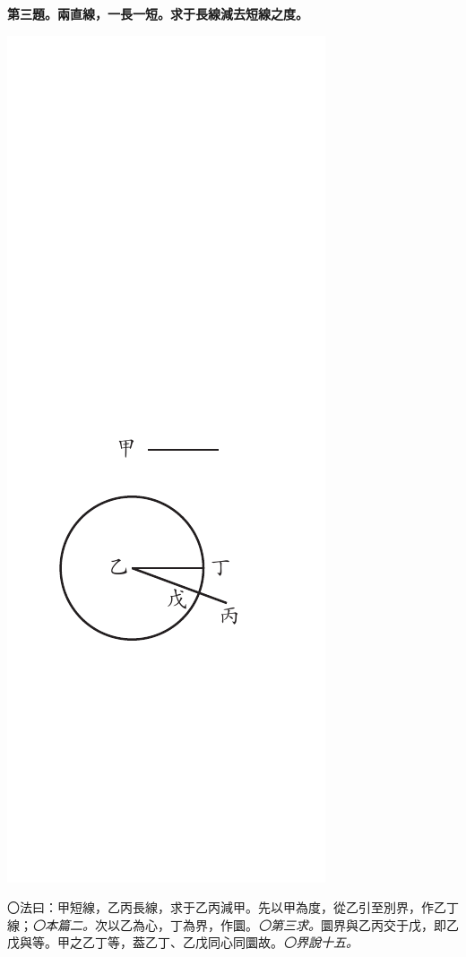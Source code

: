 \documentclass[12pt,b5paper,landscape]{article}
\newcommand{\ccom}[1]{{\footnotesize \emph{〇#1}}}
\newcommand{\bcom}[1]{〇#1}
\newcommand{\cthm}[1]{{
\vspace{8pt}

\bfseries #1}}
\begin{document}
\begin{multicols}{2}
\cthm{第三題。兩直線，一長一短。求于長線減去短線之度。}
\begin{center}
\includegraphics[angle=90]{eu37}
\end{center}
\bcom{法曰：甲短線，乙丙長線，求于乙丙減甲。先以甲為度，從乙引至別界，作乙丁線；\ccom{本篇二。}次以乙為心，丁為界，作圜。\ccom{第三求。}圜界與乙丙交于戊，即乙戊與等。甲之乙丁等，葢乙丁、乙戊同心同圜故。\ccom{界說十五。}}


\end{multicols}
\end{document}
